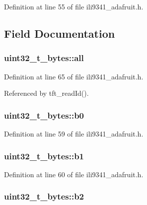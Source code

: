Definition at line 55 of file ili9341\-\_\-adafruit.\-h.



\subsection{Field Documentation}
\hypertarget{unionuint32__t__bytes_a83b0c87830b60d185365dbadf8efd4a0}{
\subsubsection[{all}]{ uint32\-\_\-t\-\_\-bytes\-::all}}\label{unionuint32__t__bytes_a83b0c87830b60d185365dbadf8efd4a0}


Definition at line 65 of file ili9341\-\_\-adafruit.\-h.



Referenced by tft\-\_\-read\-Id().

\hypertarget{unionuint32__t__bytes_a92b86537decb69327191d870f41c60f7}{
\subsubsection[{b0}]{ uint32\-\_\-t\-\_\-bytes\-::b0}}\label{unionuint32__t__bytes_a92b86537decb69327191d870f41c60f7}


Definition at line 59 of file ili9341\-\_\-adafruit.\-h.

\hypertarget{unionuint32__t__bytes_a91fb31482a2ce44b454fca964dcd556b}{
\subsubsection[{b1}]{ uint32\-\_\-t\-\_\-bytes\-::b1}}\label{unionuint32__t__bytes_a91fb31482a2ce44b454fca964dcd556b}


Definition at line 60 of file ili9341\-\_\-adafruit.\-h.

\hypertarget{unionuint32__t__bytes_a462312b99de0c6d1c497064902196e1d}{
\subsubsection[{b2}]{ uint32\-\_\-t\-\_\-bytes\-::b2}}\label{unionuint32__t__bytes_a462312b99de0c6d1c497064902196e1d}


